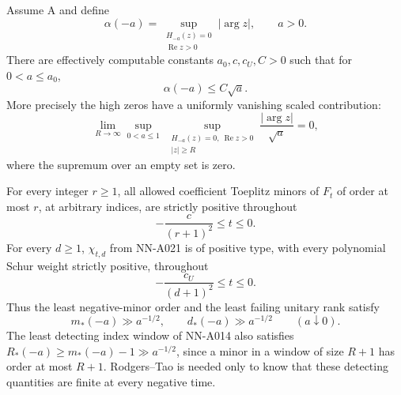 \begin{theorem}
Assume A and define
\[
 \alpha(-a)=
 \sup_{\substack{H_{-a}(z)=0\\\operatorname{Re}z>0}}|\arg z|,
                          \qquad a>0.
\]
There are effectively computable constants $a_0,c,c_U,C>0$ such
that for $0<a\le a_0$,
\begin{equation}\label{eq:analytic-root-angle-rate}
                         \alpha(-a)\le C\sqrt a.
\end{equation}
More precisely the high zeros have a uniformly vanishing
scaled contribution:
\begin{equation}\label{eq:analytic-angular-tail-small}
 \lim_{R\to\infty}
 \sup_{0<a\le1}\ 
 \sup_{\substack{H_{-a}(z)=0,\ \operatorname{Re}z>0\\|z|\ge R}}
                       \frac{|\arg z|}{\sqrt a}=0,
\end{equation}
where the supremum over an empty set is zero.

For every integer $r\ge1$, all allowed coefficient Toeplitz
minors of $F_t$ of order at most $r$, at arbitrary indices,
are strictly positive throughout
\[
                         -\frac c{(r+1)^2}\le t\le0.
\]
For every $d\ge1$, $\chi_{t,d}$ from NN-A021 is of positive
type, with every polynomial Schur weight strictly positive,
throughout
\[
                         -\frac {c_U}{(d+1)^2}\le t\le0.
\]
Thus the least negative-minor order and the least failing
unitary rank satisfy
\[
                 m_*(-a)\gg a^{-1/2},
                 \qquad d_*(-a)\gg a^{-1/2}\qquad(a\downarrow0).
\]
The least detecting index window of NN-A014 also satisfies
$R_*(-a)\ge m_*(-a)-1\gg a^{-1/2}$, since a minor in a window
of size $R+1$ has order at most $R+1$.
Rodgers--Tao is needed only to know that these detecting
quantities are finite at every negative time.
\end{theorem}

